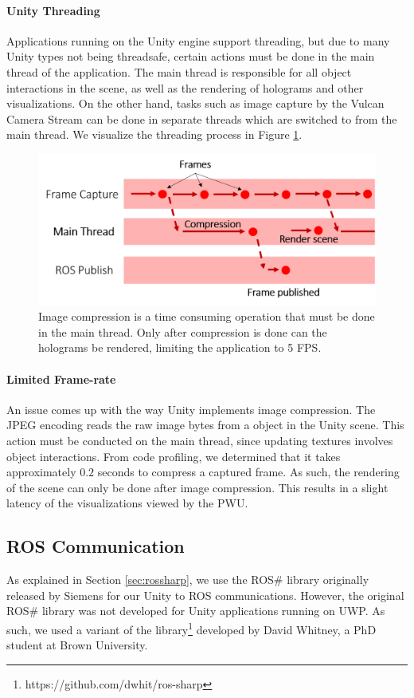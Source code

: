 \paragraph{Unity Threading} Applications running on the Unity engine support threading, but due to many Unity types not being threadsafe, certain actions must be done in the main thread of the application. The main thread is responsible for all object interactions in the scene, as well as the rendering of holograms and other visualizations. On the other hand, tasks such as image capture by the Vulcan Camera Stream can be done in separate threads which are switched to from the main thread. We visualize the threading process in Figure \ref{fig:unityThreads}.

\begin{figure}[ht]
	\centering
	\includegraphics[width=0.8\linewidth]{img/chapter5_implementation/unityThreads.png}
	\caption{Image compression is a time consuming operation that must be done in the main thread. Only after compression is done can the holograms be rendered, limiting the application to 5 FPS.}
	\label{fig:unityThreads}
\end{figure}

\paragraph{Limited Frame-rate} An issue comes up with the way Unity implements image compression. The JPEG encoding reads the raw image bytes from a  object in the Unity scene. This action must be conducted on the main thread, since updating textures involves object interactions. From code profiling, we determined that it takes approximately $0.2$ seconds to compress a captured frame. As such, the rendering of the scene can only be done after image compression. This results in a slight latency of the visualizations viewed by the PWU. 

\subsection{ROS Communication}
As explained in Section \ref{sec:rossharp}, we use the ROS\# library originally released by Siemens for our Unity to ROS communications. However, the original ROS\# library was not developed for Unity applications running on UWP. As such, we used a variant of the library\footnote{https://github.com/dwhit/ros-sharp} developed by David Whitney, a PhD student at Brown University. 

